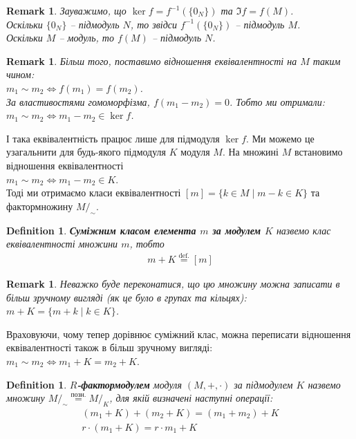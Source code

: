 \documentclass[a4paper, 10pt]{article}
\theoremstyle{theoremdd}
\theoremstyle{theoremdd}
\newtheorem{definition}[theorem]{Definition}
\theoremstyle{theoremdd}
\theoremstyle{theoremdd}
\theoremstyle{theoremdd}
\theoremstyle{theoremdd}
\theoremstyle{theoremdd}
\theoremstyle{theoremdd}
\theoremstyle{theoremdd}
\theoremstyle{theoremdd}
\theoremstyle{theoremdd}
\newtheorem{remark}[theorem]{Remark}
\theoremstyle{theoremdd}
\theoremstyle{theoremdd}
\theoremstyle{theoremdd}
\theoremstyle{theoremdd}
\newcommand{\eqbydef}{\overset{\text{def.}}{=}}
\begin{document}
\begin{remark}
Зауважимо, що $\ker f = f^{-1}(\{0_N\})$ та $\Im f = f(M)$.\\
Оскільки $\{0_N\}$ -- підмодуль $N$, то звідси $f^{-1}(\{0_N\})$ -- підмодуль $M$.\\
Оскільки $M$ -- модуль, то $f(M)$ -- підмодуль $N$.
\end{remark}

\begin{remark}
Більш того, поставимо відношення еквівалентності на $M$ таким чином:\\
$m_1 \sim m_2 \iff f(m_1) = f(m_2)$.\\
За властивостями гомоморфізма, $f(m_1-m_2) = 0$. Тобто ми отримали:\\
$m_1 \sim m_2 \iff m_1 - m_2 \in \ker f$.
\end{remark}

І така еквівалентність працює лише для підмодуля $\ker f$. Ми можемо це узагальнити для будь-якого підмодуля $K$ модуля $M$. На множині $M$ встановимо відношення еквівалентності\\
$m_1 \sim m_2 \iff m_1 - m_2 \in K$.\\
Тоді ми отримаємо класи еквівалентності $[m] = \{k \in M \mid m-k \in K\}$ та фактормножину $M/_{\sim}$.

\begin{definition}
\textbf{Суміжним класом елемента $m$ за модулем $K$} назвемо клас еквівалентності множини $m$, тобто
\begin{align*}
m+K \eqbydef [m]
\end{align*}
\end{definition}

\begin{remark}
Неважко буде переконатися, що цю множину можна записати в більш зручному вигляді (як це було в групах та кільцях):\\
$m + K = \{m + k \mid k \in K\}$.
\end{remark}

Враховуючи, чому тепер дорівнює суміжний клас, можна переписати відношення еквівалентності також в більш зручному вигляді:\\
$m_1 \sim m_2 \iff m_1 + K = m_2 + K$.

\begin{definition}
\textbf{$R$-фактормодулем} модуля $(M,+,\cdot)$ за підмодулем $K$ назвемо множину $M/_\sim \overset{\text{позн.}}{=} M/_K$, для якій визначені наступні операції:
\begin{align*}
(m_1 + K) + (m_2 + K) = (m_1 + m_2) + K \\
r \cdot (m_1 + K) = r \cdot m_1 + K
\end{align*}
\end{definition}
\end{document}
